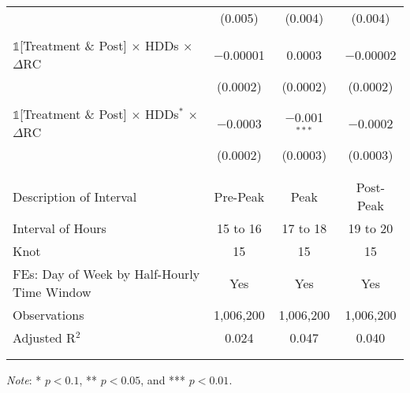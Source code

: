 {\begin{table}[t!]
\begin{adjustbox}{scale = 1.0}
\begin{threeparttable}
\begin{tabular}{@{\extracolsep{40pt}}lccc}
                    & (0.005) & (0.004) & (0.004) \\
                    & & & \\
                    $\mathbb{1}$[Treatment \& Post] $\times$ HDDs $\times$ $\Delta$RC & $-$0.00001 & 0.0003 & $-$0.00002 \\
                    & (0.0002) & (0.0002) & (0.0002) \\
                    & & & \\
                    $\mathbb{1}$[Treatment \& Post] $\times$ HDDs$^{*}$ $\times$ $\Delta$RC & $-$0.0003 & $-$0.001$^{***}$ & $-$0.0002 \\
                    & (0.0002) & (0.0003) & (0.0003) \\
                    & & & \\
                    \hline
                    \\[-2.0ex]
                    Description of Interval & Pre-Peak & Peak & Post-Peak \\
                    Interval of Hours & 15 to 16 & 17 to 18 & 19 to 20 \\
                    Knot & 15 & 15 & 15 \\
                    FEs: Day of Week by Half-Hourly Time Window & Yes & Yes & Yes \\
                    Observations & 1,006,200 & 1,006,200 & 1,006,200 \\
                    Adjusted R$^{2}$ & 0.024 & 0.047 & 0.040 \\
                    \\[-2.0ex]
                    \hline \hline
                    \\[-4.5ex]
                \end{tabular}
                \begin{tablenotes}[flushleft]
                    \footnotesize
                    \item \textit{Note}: * $p < 0.1$, ** $p < 0.05$, and *** $p < 0.01$.
                \end{tablenotes}
            \end{threeparttable}
        \end{adjustbox}
    \end{table}
}
